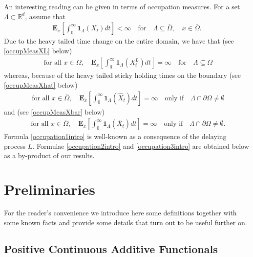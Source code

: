 \documentclass[11pt,a4paper]{article}
\begin{document}
An interesting reading can be given in terms of occupation measures. For a set $\Lambda \subset \mathbb{R}^d$, assume that
\begin{align}
\mathbf{E}_x \left[ \int_0^\infty \mathbf{1}_\Lambda(X_t) dt \right] < \infty \quad \textrm{for} \quad  \Lambda \subseteq \bar{\Omega}, \quad x \in \bar{\Omega}.
\label{ASShtINTRO}
\end{align}
Due to the heavy tailed time change on the entire domain, we have that (see \eqref{occupMeasXL} below) 
\begin{align}
\textrm{ for all } x \in \bar{\Omega}, \quad \mathbf{E}_x \left[ \int_0^\infty \mathbf{1}_\Lambda(X^L_t) dt \right] = \infty \quad \textrm{for} \quad \Lambda \subseteq \bar{\Omega}   
\label{occupation1intro}
\end{align}
whereas, because of the heavy tailed sticky holding times on the boundary (see \eqref{occupMeasXhat} below)
\begin{align}
\textrm{ for all } x \in \bar{\Omega}, \quad  \mathbf{E}_x \left[ \int_0^\infty \mathbf{1}_\Lambda(\hat{X}_t) dt \right] = \infty \quad \textrm{only if} \quad \Lambda \cap \partial \Omega \neq \emptyset
\label{occupation2intro}
\end{align}
and (see \eqref{occupMeasXbar} below)
\begin{align}
\textrm{ for all } x \in \bar{\Omega}, \quad  \mathbf{E}_x \left[ \int_0^\infty \mathbf{1}_\Lambda(\bar{X}_t) dt \right]
= \infty \quad \textrm{only if} \quad \Lambda \cap \partial \Omega \neq \emptyset.
\label{occupation3intro}
\end{align}
Formula \eqref{occupation1intro} is well-known as a consequence of the delaying process $L$. Formulae \eqref{occupation2intro} and \eqref{occupation3intro} are obtained below as a by-product of our results. 



\section{Preliminaries}
\label{Sec:NotPre}

For the reader's convenience we introduce here some definitions together with some known facts and provide some details that turn out to be useful further on.


\subsection{Positive Continuous Additive Functionals}
\end{document}
